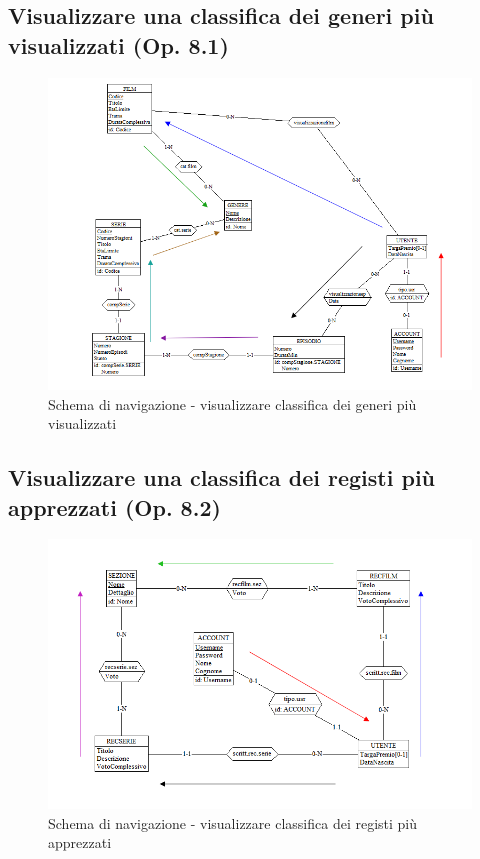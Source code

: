 \documentclass[a4paper,12pt]{report}
\begin{document}
	\subsection{Visualizzare una classifica dei generi più visualizzati (Op. 8.1)}
	\begin{figure}[H]
		\centering
		\includegraphics[width=450pt]{ER/navigazione/classificageneri.png}
		\caption{Schema di navigazione - visualizzare classifica dei generi più visualizzati}
	\end{figure}	
	
	\subsection{Visualizzare una classifica dei registi più apprezzati (Op. 8.2)}
	\begin{figure}[H]
		\centering
		\includegraphics[width=450pt]{ER/navigazione/classificaregisti.png}
		\caption{Schema di navigazione - visualizzare classifica dei registi più apprezzati}
	\end{figure}
	
\end{document}
